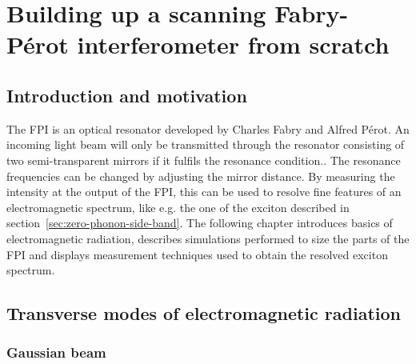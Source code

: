 \chapter{Building up a scanning Fabry-Pérot interferometer from scratch}
\label{chapter:scanning-fabry-perot}
\section{Introduction and motivation}

The \ac{FPI} is an optical resonator developed by Charles Fabry and Alfred Pérot.
An incoming light beam will only be transmitted through the resonator consisting of two semi-transparent mirrors if it fulfils the resonance condition.\cite{kaldewey_coherent_2017}.
The resonance frequencies can be changed by adjusting the mirror distance.
By measuring the intensity at the output of the \ac{FPI}, this can be used to resolve fine features of an electromagnetic spectrum, like e.g. the one of the exciton described in section~\ref{sec:zero-phonon-side-band}.
The following chapter introduces basics of electromagnetic radiation, describes simulations performed to size the parts of the \ac{FPI} and displays measurement techniques used to obtain the resolved exciton spectrum.

\section{Transverse modes of electromagnetic radiation}


\subsection{Gaussian beam}
\label{subsec:gaussian-beam}

